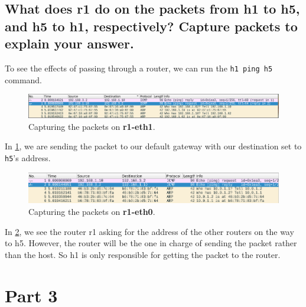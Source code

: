 \documentclass{article}
\begin{document}
\subsection{What does r1 do on the packets from h1 to h5, and h5 to h1,
respectively? Capture packets to explain your answer.}
To see the effects of passing through a router, we can run the \texttt{h1 ping h5}
command.
\begin{figure}
		\centering
		\label{fig:r1-eth1}
		\includegraphics[scale=0.5]{r1eth-1.png}
		\caption{Capturing the packets on \textbf{r1-eth1}.}
\end{figure}
In \ref{fig:r1-eth1}, we are sending the packet to our default gateway with our 
destination set to \texttt{h5}'s address.

\begin{figure}[h]
		\centering
		\label{fig:r1-eth0}
		\includegraphics[scale=0.5]{r1-eth0.png}
		\caption{Capturing the packets on \textbf{r1-eth0}.}
\end{figure}

In \ref{fig:r1-eth0}, we see the router r1 asking for the address of the other
routers on the way to h5.
However, the router will be the one in charge of sending the packet rather than
the host.
So h1 is only responsible for getting the packet to the router.

\section{Part 3}
\end{document}

